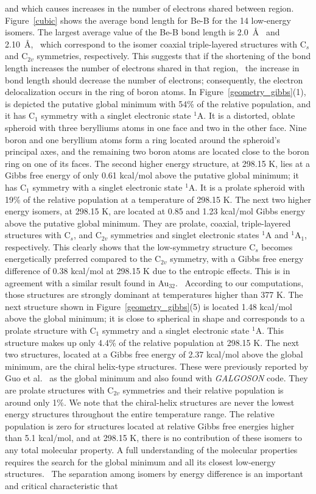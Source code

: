 \documentclass[prb,aps,preprint,showkeys,showpacs]{revtex4}
\begin{document}
 and which causes increases in the number of electrons shared between region. Figure~\ref{cubic} shows the average bond length for Be-B for the 14 low-energy isomers. The largest average value of the Be-B bond length is 2.0~\AA~ and 2.10~\AA,~ which correspond to the isomer coaxial triple-layered structures with C$_s$ and C$_{2v}$ symmetries, respectively. This suggests that if the shortening of the bond length increases the number of electrons shared in that region,~\cite{Feixas} the increase in bond length should decrease the number of electrons; consequently, the electron delocalization occurs in the ring of boron atoms. In Figure~\ref{geometry_gibbs}(1), is depicted the putative global minimum with 54{\%} of the relative population, and it has C$_1$ symmetry with a singlet electronic state $^{1}$A. It is a distorted, oblate spheroid with three berylliums atoms in one face and two in the other face. Nine boron and one beryllium atoms form a ring located around the spheroid's principal axes, and the remaining two boron atoms are located close to the boron ring on one of its faces. The second higher energy structure, at 298.15 K, lies at a Gibbs free energy of only 0.61 kcal/mol above the putative global minimum; it has C$_1$ symmetry with a singlet electronic state $^1$A. It is a prolate spheroid with 19{\%} of the relative population at a temperature of 298.15 K. The next two higher energy isomers, at 298.15 K, are located at 0.85 and 1.23 kcal/mol Gibbs energy above the putative global minimum. They are prolate, coaxial, triple-layered structures with C$_s$, and C$_{2v}$ symmetries and singlet electronic states $^1$A and $^1$A$_1$, respectively. This clearly shows that the low-symmetry structure C$_s$ becomes energetically preferred compared to the C$_{2v}$ symmetry, with a Gibbs free energy difference of 0.38 kcal/mol at 298.15 K due to the entropic effects. This is in agreement with a similar result found in Au$_{32}$.~\cite{Min} According to our computations, those structures are strongly dominant at temperatures higher than 377 K. The next structure shown in Figure~\ref{geometry_gibbs}(5) is located 1.48 kcal/mol above the global minimum; it is close to spherical in shape and corresponds to a prolate structure with C$_1$ symmetry and a singlet electronic state $^1$A. This structure makes up only 4.4{\%} of the relative population at 298.15 K. The next two structures, located at a Gibbs free energy of 2.37 kcal/mol above the global minimum, are the chiral helix-type structures. These were previously reported by Guo et al.~\cite{Guo} as the global minimum and also found with \emph{GALGOSON} code. They are prolate structures with C$_{2v}$ symmetries and their relative population is around only 1{\%}. We note that the chiral-helix structures are never the lowest energy structures throughout the entire temperature range. The relative population is zero for structures located at relative Gibbs free energies higher than 5.1 kcal/mol, and at 298.15 K, there is no contribution of these isomers to any total molecular property. A full understanding of the molecular properties requires the search for the global minimum and all its closest low-energy structures.~\cite{Zhen} The separation among isomers by energy difference is an important and critical characteristic that 
\end{document}
